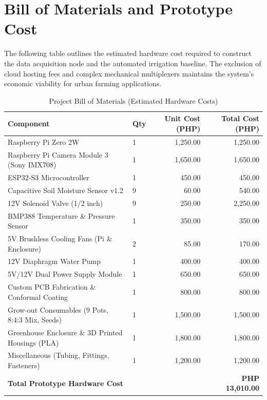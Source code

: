 
\chapter{Bill of Materials and Prototype Cost}

\ifpdf
    \graphicspath{{Appendix4/Figs/Raster/}{Appendix4/Figs/PDF/}{Appendix4/Figs/}}
\else
    \graphicspath{{Appendix4/Figs/Vector/}{Appendix4/Figs/}}
\fi

The following table outlines the estimated hardware cost required to construct the data acquisition node and the automated irrigation baseline. The exclusion of cloud hosting fees and complex mechanical multiplexers maintains the system's economic viability for urban farming applications.

\begin{table}[htbp]
    \centering
    \caption{Project Bill of Materials (Estimated Hardware Costs)}
    \begin{tabular}{@{}llrr@{}}
        \toprule
        \textbf{Component} & \textbf{Qty} & \textbf{Unit Cost (PHP)} & \textbf{Total Cost (PHP)} \\
        \midrule
        Raspberry Pi Zero 2W & 1 & 1,250.00 & 1,250.00 \\
        Raspberry Pi Camera Module 3 (Sony IMX708) & 1 & 1,650.00 & 1,650.00 \\
        ESP32-S3 Microcontroller & 1 & 450.00 & 450.00 \\
        Capacitive Soil Moisture Sensor v1.2 & 9 & 60.00 & 540.00 \\
        12V Solenoid Valve (1/2 inch) & 9 & 250.00 & 2,250.00 \\
        BMP388 Temperature \& Pressure Sensor & 1 & 350.00 & 350.00 \\
        5V Brushless Cooling Fans (Pi \& Enclosure) & 2 & 85.00 & 170.00 \\
        12V Diaphragm Water Pump & 1 & 400.00 & 400.00 \\
        5V/12V Dual Power Supply Module & 1 & 650.00 & 650.00 \\
        Custom PCB Fabrication \& Conformal Coating & 1 & 800.00 & 800.00 \\
        Grow-out Consumables (9 Pots, 8:4:3 Mix, Seeds) & 1 & 1,500.00 & 1,500.00 \\
        Greenhouse Enclosure \& 3D Printed Housings (PLA) & 1 & 1,800.00 & 1,800.00 \\
        Miscellaneous (Tubing, Fittings, Fasteners) & 1 & 1,200.00 & 1,200.00 \\
        \midrule
        \textbf{Total Prototype Hardware Cost} & & & \textbf{PHP 13,010.00} \\
        \bottomrule
    \end{tabular}
    \label{tab:bom}
\end{table}


\clearpage
